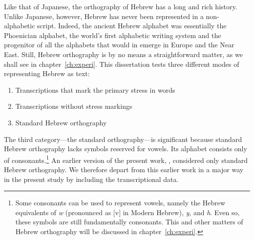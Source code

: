 Like that of Japanese, the orthography of Hebrew has a long and rich history. Unlike Japanese, however, Hebrew has never been represented in a non-alphabetic script. Indeed, the ancient Hebrew alphabet was essentially the Phoenician alphabet, the world's first alphabetic writing system and the progenitor of all the alphabets that would in emerge in Europe and the Near East. Still, Hebrew orthography is by no means a straightforward matter, as we shall see in chapter~\ref{ch:experi}.
This dissertation tests three different modes of representing Hebrew as text:
\begin{enumerate}[itemsep=0pt]
\item Transcriptions that mark the primary stress in words
\item Transcriptions without stress markings 
\item Standard Hebrew orthography 
\end{enumerate} 
The third category---the standard orthography---is significant because standard Hebrew 
orthography lacks symbols reserved for vowels. Its alphabet consists only of consonants.\footnote{Some 
consonants can be used to represent vowels, namely the Hebrew equivalents of \textit{w} 
(pronounced as [v] in Modern Hebrew), \textit{y}, and \textit{h}. Even so, these symbols 
are still fundamentally consonants. This and other matters of Hebrew orthography 
will be discussed in chapter~\ref{ch:experi}.} An earlier version of the present work, 
\citet{meyer-and-dickinson:2016}, considered only standard Hebrew orthography. 
We therefore depart from this earlier work in a major way in the present study by including the transcriptional data. 

